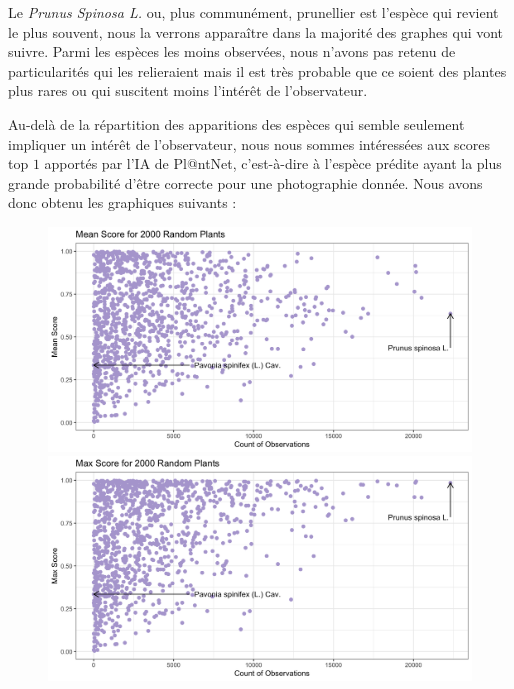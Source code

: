 \documentclass[a4paper,12pt]{article}
\begin{document}
\vspace{0.2cm}

Le \textit{Prunus Spinosa L.} ou, plus communément, prunellier est l'espèce qui revient le plus souvent, nous la verrons apparaître dans la majorité des graphes qui vont suivre. Parmi les espèces les moins observées, nous n'avons pas retenu de particularités qui les relieraient mais il est très probable que ce soient des plantes plus rares ou qui suscitent moins l'intérêt de l'observateur.

\vspace{0.2cm}

Au-delà de la répartition des apparitions des espèces qui semble seulement impliquer un intérêt de l'observateur, nous nous sommes intéressées aux scores top $1$ apportés par l'IA de Pl@ntNet, c'est-à-dire à l'espèce prédite ayant la plus grande probabilité d'être correcte pour une photographie donnée. Nous avons donc obtenu les graphiques suivants :

\begin{figure}[H]
\centering
\begin{minipage}{0.5\textwidth}
  \includegraphics[width=0.8\linewidth]{images/mean_rd.png}
\end{minipage}%
\begin{minipage}{0.5\textwidth}
  \includegraphics[width=0.8\linewidth]{images/max_rd.png}
\end{minipage}
\end{figure}
\end{document}
